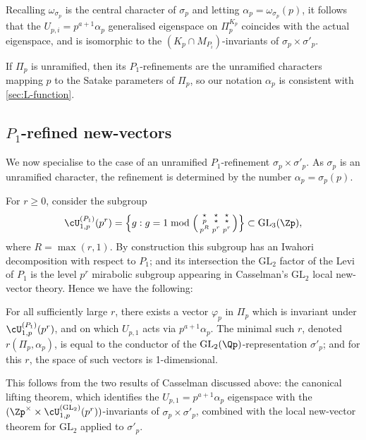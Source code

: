 \documentclass[10pt,reqno,a4paper]{amsart}
\newcommand{\GL}{\mathrm{GL}}
\newcommand{\smallthreemat}[9]{\left(\begin{smallmatrix}
#1 & #2 & #3 \\
#4 & #5 & #6 \\
#7 & #8 & #9\end{smallmatrix}\right)}
\begin{document}
 Recalling $\omega_{\sigma_p}$ is the central character of $\sigma_p$ and letting $\alpha_p = \omega_{\sigma_p}(p)$, it follows that the $U_{p, i} = p^{a + 1} \alpha_p$ generalised eigenspace on $\Pi_p^{K_p}$ coincides with the actual eigenspace, and is isomorphic to the $(K_p \cap M_{P_i})$-invariants of $\sigma_p \times \sigma'_p$.


\begin{remark}
If $\Pi_p$ is unramified, then its $P_1$-refinements are the unramified characters mapping $p$ to the Satake parameters of $\Pi_p$, so our notation $\alpha_p$ is consistent with \cref{sec:L-function}.
\end{remark}


\subsection{\texorpdfstring{$P_1$}{P1}-refined new-vectors}
\label{sect:refnewforms}
We now specialise to the case of an unramified $P_1$-refinement $\sigma_p \times \sigma'_p$. As $\sigma_p$ is an unramified character, the refinement is determined by the number $\alpha_p = \sigma_p(p)$. 

For $r \ge 0$, consider the subgroup
\begin{equation}\label{eq:U_p(Pi)}
\cU_{1, p}^{(P_1)}(p^r) = \left\{ g: g = 1 \bmod \smallthreemat{\star}{\star}{\star} {p}{\star}{\star} {p^R}{p^r}{p^r}\right\} \subset \GL_3(\Zp),
\end{equation}
where $R = \max(r, 1)$. By construction this subgroup has an Iwahori decomposition with respect to $P_1$; and its intersection the $\GL_2$ factor of the Levi of $P_1$ is the level $p^r$ mirabolic subgroup appearing in Casselman's $\GL_2$ local new-vector theory. Hence we have the following:


\begin{proposition}\label{prop:P_1 conductor}
For all sufficiently large $r$, there exists a vector $\varphi_p$ in $\Pi_p$ which is invariant under $\cU_{1, p}^{(P_1)}(p^r)$, and on which $U_{p, 1}$ acts via $p^{a+1} \alpha_p$. The minimal such $r$, denoted $r(\Pi_p, \alpha_p)$, is equal to the conductor of the $\GL_2(\Qp)$-representation $\sigma'_p$; and for this $r$, the space of such vectors is 1-dimensional.
\end{proposition}

This follows from the two results of Casselman discussed above: the canonical lifting theorem, which identifies the $U_{p, 1} = p^{a+1} \alpha_p$ eigenspace with the $(\Zp^\times \times \cU_{1, p}^{(\GL_2)}(p^r))$-invariants of $\sigma_p \times \sigma'_p$, combined with the local new-vector theorem for $\GL_2$ applied to $\sigma'_p$.
\end{document}
